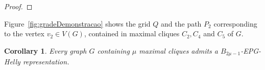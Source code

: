 \documentclass[preprint,12pt]{elsarticle} %
\newtheorem{coro}[theorem]{Corollary}
\begin{document}
\begin{proof}
  
 
 
 \end{proof}
 
 Figure~\ref{fig:gradeDemonstracao} shows the grid $Q$ and the path $P_2$ corresponding to the vertex $v_2 \in V(G)$, contained in maximal cliques $C_2, C_4$ and $C_5$ of $G$.
 
  
 
 
 \begin{coro}
 Every graph $G$ containing $\mu$ maximal cliques admits a $B_{2\mu -1}$-EPG-Helly representation. %
 \end{coro}
 
\end{document}
